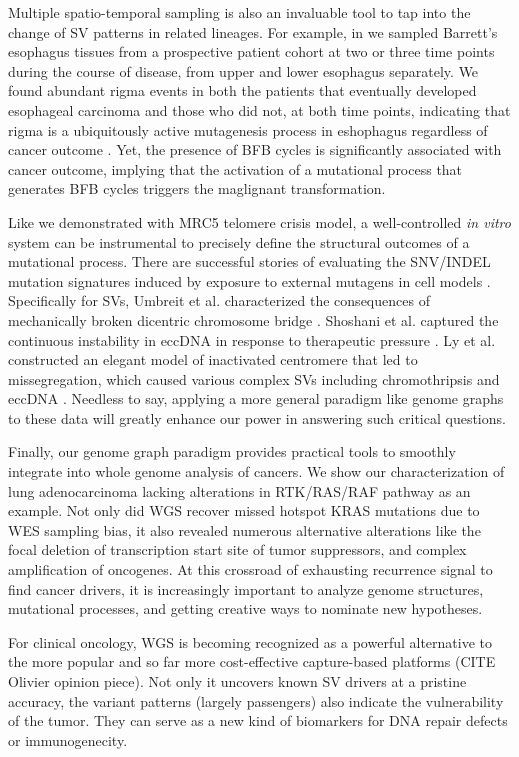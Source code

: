 \documentclass[phd,tocprelim]{cornell}
\begin{document}
Multiple spatio-temporal sampling is also an invaluable tool to tap into the change of SV patterns in related lineages. For example, in \cite{Paulson2021-nd} we sampled Barrett's esophagus tissues from a prospective patient cohort at two or three time points during the course of disease, from upper and lower esophagus separately. We found abundant rigma events in both the patients that eventually developed esophageal carcinoma and those who did not, at both time points, indicating that rigma is a ubiquitously active mutagenesis process in eshophagus regardless of cancer outcome \cite{Hadi2020-um}. Yet, the presence of BFB cycles is significantly associated with cancer outcome, implying that the activation of a mutational process that generates BFB cycles triggers the maglignant transformation.

Like we demonstrated with MRC5 telomere crisis model, a well-controlled \textit{in vitro} system can be instrumental to precisely define the structural outcomes of a mutational process. There are successful stories of evaluating the SNV/INDEL mutation signatures induced by exposure to external mutagens in cell models \cite{Zou2021-je}. Specifically for SVs, Umbreit et al. characterized the consequences of mechanically broken dicentric chromosome bridge \cite{Umbreit2020-kr}. Shoshani et al. captured the continuous instability in eccDNA in response to therapeutic pressure \cite{Shoshani2020-zj}. Ly et al. constructed an elegant model of inactivated centromere that led to missegregation, which caused various complex SVs including chromothripsis and eccDNA \cite{Ly2019-bt}. Needless to say, applying a more general paradigm like genome graphs to these data will greatly enhance our power in answering such critical questions.

Finally, our genome graph paradigm provides practical tools to smoothly integrate into whole genome analysis of cancers. We show our characterization of lung adenocarcinoma lacking alterations in RTK/RAS/RAF pathway as an example. Not only did WGS recover missed hotspot KRAS mutations due to WES sampling bias, it also revealed numerous alternative alterations like the focal deletion of transcription start site of tumor suppressors, and complex amplification of oncogenes. At this crossroad of exhausting recurrence signal to find cancer drivers, it is increasingly important to analyze genome structures, mutational processes, and getting creative ways to nominate new hypotheses.

For clinical oncology, WGS is becoming recognized as a powerful alternative to the more popular and so far more cost-effective capture-based platforms (CITE Olivier opinion piece). Not only it uncovers known SV drivers at a pristine accuracy, the variant patterns (largely passengers) also indicate the vulnerability of the tumor. They can serve as a new kind of biomarkers for DNA repair defects or immunogenecity.
\end{document}
